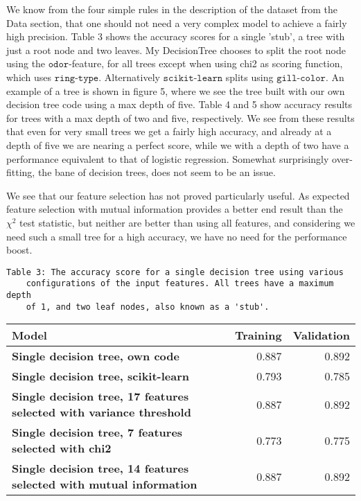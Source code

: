 \documentclass[11pt]{article}
\begin{document}
 We know from the four simple rules in the description of the dataset from the Data section, that one should not need a very complex model to achieve a fairly high precision. Table 3 shows the accuracy scores for a single 'stub', a tree with just a root node and two leaves. My DecisionTree chooses to split the root node using the $\texttt{odor}$-feature, for all trees except when using chi2 as scoring function, which uses $\texttt{ring-type}$. Alternatively $\texttt{scikit-learn}$ splits using $\texttt{gill-color}$. An example of a tree is shown in figure 5, where we see the tree built with our own decision tree code using a max depth of five. Table 4 and 5 show accuracy results for trees with a max depth of two and five, respectively. We see from these results that even for very small trees we get a fairly high accuracy, and already at a depth of five we are nearing a perfect score, while we with a depth of two have a performance equivalent to that of logistic regression. Somewhat surprisingly over-fitting, the bane of decision trees, does not seem to be an issue.

We see that our feature selection has not proved particularly useful. As expected feature selection with mutual information provides a better end result than the \(\chi^2\) test statistic, but neither are better than using all features, and considering we need such a small tree for a high accuracy, we have no need for the performance boost.

\begin{Verbatim}[commandchars=\\\{\}]
	Table 3: The accuracy score for a single decision tree using various 
	configurations of the input features. All trees have a maximum depth 
	of 1, and two leaf nodes, also known as a 'stub'.
\end{Verbatim}

\begin{table}[h!]
	\begin{center}
		\label{tab:table1}
		\begin{tabular}{l|r|r}
        \textbf{Model}                                                      		   & \textbf{Training} & \textbf{Validation}
        \\ \hline
		\textbf{Single decision tree, own code}                                        & 0.887             & 0.892               \\ \hline
		\textbf{Single decision tree, scikit-learn}                                    & 0.793             & 0.785               \\ \hline
		\textbf{Single decision tree, 17 features selected with variance threshold}    & 0.887             & 0.892               \\ \hline
		\textbf{Single decision tree, 7 features selected with chi2}                   & 0.773             & 0.775               \\ \hline
		\textbf{Single decision tree, 14 features selected with mutual information}    & 0.887             & 0.892               \\ \hline
		\end{tabular}
	\end{center}
\end{table}
\end{document}
